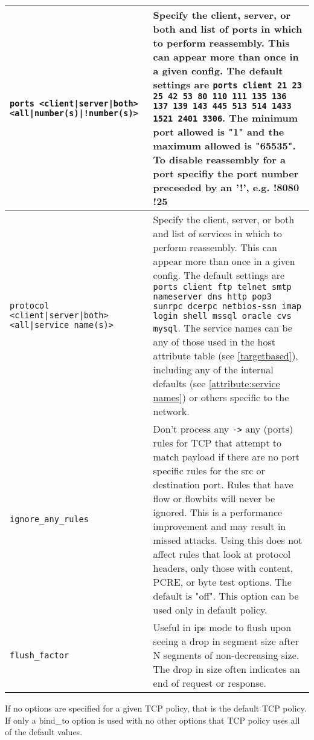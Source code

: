 \documentclass[english]{report}
\newenvironment{note}{
\samepage
    \vspace{10pt}{\textsf{
        {\hspace{7pt}\Huge{$\triangle$\hspace{-12.5pt}{\Large{$^!$}}}}\hspace{5pt}
        {\Large{NOTE}}
    }
    }
   \begin{center}
    \par\vspace{-17pt}

    \begin{lrbox}{\savepar}
    \begin{minipage}[r]{6in}
}
{
    \end{minipage}
    \end{lrbox}
    \fbox{
        \usebox{
            \savepar
	}
    }
    \par\vskip10pt
    \end{center}
}
\newenvironment{note}{
        \begin{rawhtml}
        <p><table border="1"><tr><td><b>
        Note:&nbsp;&nbsp;</b>
        \end{rawhtml}
}{
        \begin{rawhtml}
        </b></td></tr></table></p>
        \end{rawhtml}
}
\begin{document}
\begin{longtable}[h]{| p{2in} | p{4in} |}
\hline
\texttt{ports <client|server|both> <all|number(s)|!number(s)>} &


Specify the client, server, or both and list of ports in which to perform
reassembly.  This can appear more than once in a given config.  The default
settings are \texttt{ports client 21 23 25 42 53 80 110 111 135 136 137 139 143
445 513 514 1433 1521 2401 3306}.  The minimum port allowed is "1" and the
maximum allowed is "65535".  To disable reassembly for a port specifiy the port
number preceeded by an '!', e.g. !8080 !25\\

\hline
\texttt{protocol <client|server|both> <all|service name(s)>} &


Specify the client, server, or both and list of services in which to perform
reassembly.  This can appear more than once in a given config.  The default
settings are \texttt{ports client ftp telnet smtp nameserver dns http pop3
sunrpc dcerpc netbios-ssn imap login shell mssql oracle cvs mysql}.  The
service names can be any of those used in the host attribute table (see
\ref{targetbased}), including any of the internal defaults (see
\ref{attribute:service names}) or others specific to the network.\\

\hline
\texttt{ignore\_any\_rules} &

Don't process any \texttt{->} any (ports) rules for TCP that attempt to match
payload if there are no port specific rules for the src or destination port.
Rules that have flow or flowbits will never be ignored.  This is a performance
improvement and may result in missed attacks.  Using this does not affect rules
that look at protocol headers, only those with content, PCRE, or byte test
options.  The default is "off". This option can be used only in default
policy.\\

\hline
\texttt{flush\_factor} &

Useful in ips mode to flush upon seeing a drop in segment size after N
segments of non-decreasing size.  The drop in size often indicates an
end of request or response.\\

\hline
\end{longtable}

\begin{note}

If no options are specified for a given TCP policy, that is the default TCP
policy.  If only a bind\_to option is used with no other options that TCP
policy uses all of the default values.

\end{note}
\end{document}
